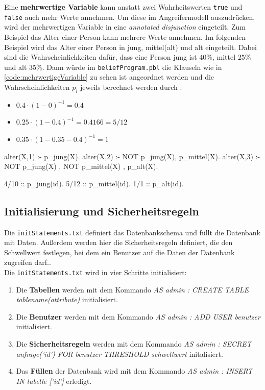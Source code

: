 \documentclass[german,version-2020-11]{uzl-thesis}
\begin{document}
Eine \textbf{mehrwertige Variable} kann anstatt zwei Wahrheitswerten \texttt{true} und \texttt{false} auch mehr Werte annehmen.
Um diese im Angreifermodell auszudrücken, wird der mehrwertigen Variable in eine \textit{annotated disjunction} eingeteilt. Zum Beispiel das Alter einer Person kann mehrere Werte annehmen. Im folgenden Beispiel wird das Alter einer Person in jung, mittel(alt) und alt eingeteilt. Dabei sind die Wahrscheinlichkeiten dafür, dass eine Person jung ist $40\%$, mittel $25\%$ und alt $35\%$. Dann würde im \texttt{beliefProgram.pbl} die Klauseln wie in \autoref{code:mehrwertigeVariable} zu sehen ist angeordnet werden und die Wahrscheinlichkeiten $p_i$ jeweils berechnet werden durch : 
\begin{itemize}
	\item $0.4 \cdot (1- 0)^{-1} = 0.4 $
	\item  $0.25 \cdot (1 - 0.4)^{-1} = 0.4166 = 5/12 $
	\item $ 0.35 \cdot (1 - 0.35 - 0.4)^{-1} = 1 $
\end{itemize}
\begin{Pseudocode}[caption={Beispiel für mehrwertige Variablen}, label={code:mehrwertigeVariable}]
alter(X,1) :- p_jung(X).
alter(X,2) :- NOT p_jung(X), p_mittel(X).
alter(X,3) :- NOT p_jung(X) , NOT p_mittel(X) , p_alt(X).

4/10 :: p_jung(id).
5/12 :: p_mittel(id).
1/1 :: p_alt(id).
\end{Pseudocode} 


\subsection{Initialisierung und Sicherheitsregeln}
Die \texttt{initStatements.txt} definiert das Datenbankschema und füllt die Datenbank mit Daten. Außerdem werden hier die Sicherheitsregeln definiert, die den Schwellwert festlegen, bei dem ein Benutzer auf die Daten der Datenbank zugreifen darf.. \\  
Die \texttt{initStatements.txt} wird in vier Schritte initialisiert:
\begin{enumerate}
	\item Die \textbf{Tabellen } werden mit dem Kommando \textit{AS admin : CREATE TABLE tablename(attribute)} initialisiert. 
	\item  Die \textbf{Benutzer} werden mit dem Kommando \textit{AS admin : ADD USER benutzer} initialisiert. 
	\item Die \textbf{Sicherheitsregeln}  werden mit dem Kommando \textit{AS admin : SECRET anfrage('id') FOR benutzer THRESHOLD schwellwert} initalisiert.
	\item Das \textbf{Füllen} der Datenbank wird mit dem Kommando \textit{AS admin : INSERT IN tabelle ['id']} erledigt.
\end{enumerate} 
\end{document}
